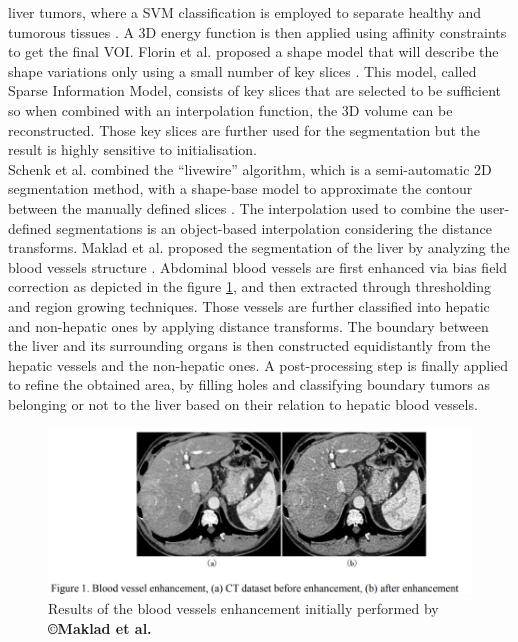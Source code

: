 \documentclass[]{article}
\begin{document}
	liver tumors, where a SVM classification is employed to separate healthy
	and tumorous tissues \cite{Freiman2011}. A 3D energy function is then applied using
	affinity constraints to get the final VOI.
	Florin et al. proposed a shape model that will describe the shape
	variations only using a small number of key slices \cite{Florin2007}. This model, called Sparse Information Model, consists of key slices that are selected to be
	sufficient so when combined with an interpolation function, the 3D
	volume can be reconstructed. Those key slices are further used for the
	segmentation but the result is highly sensitive to initialisation.\\
	Schenk et al. combined the ``livewire'' algorithm, which is a semi-automatic 2D segmentation method, with a
	shape-base model to approximate the contour between the manually defined
	slices \cite{Schenk2000}. The interpolation used to combine the user-defined segmentations
	is an object-based interpolation considering the distance transforms.
	Maklad et al. proposed the segmentation of the liver by analyzing the blood vessels
	structure \cite{Maklad2013}. Abdominal blood vessels are first enhanced via bias field correction as depicted in the figure \ref{Maklad2013_Fig1}, and then extracted through thresholding
	and region growing techniques. Those vessels are further classified into
	hepatic and non-hepatic ones by applying distance transforms. The
	boundary between the liver and its surrounding organs is then
	constructed equidistantly from the hepatic vessels and the non-hepatic
	ones. A post-processing step is finally applied to refine the obtained
	area, by filling holes and classifying boundary tumors as belonging or
	not to the liver based on their relation to hepatic blood vessels.
	
	\begin{figure}[th!]
		\centering
		\includegraphics[width=0.7\linewidth]{images/image4}
		\caption{Results of the blood vessels enhancement initially performed by \textbf{©Maklad et al.} \cite{Maklad2013}}
		\label{Maklad2013_Fig1}
	\end{figure}
	
\end{document}
